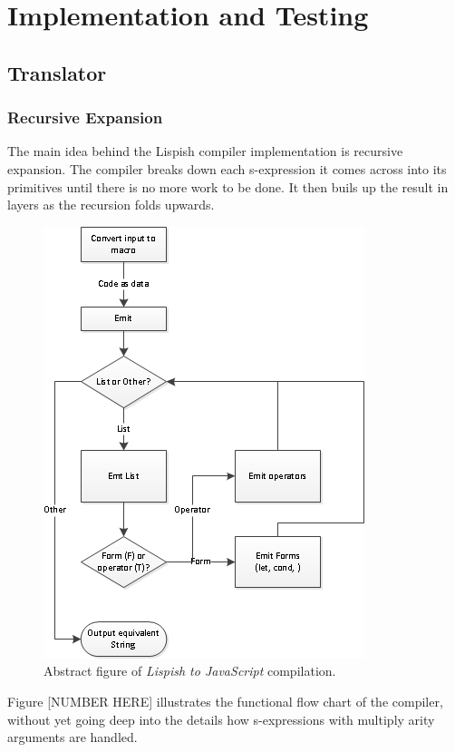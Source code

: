 \chapter{Implementation and Testing}

\section{Translator}

\subsection{Recursive Expansion}
The main idea behind the Lispish compiler implementation is recursive expansion.
The compiler breaks down each s-expression it comes across into its primitives until there is no more work to be done. It then buils up the result in layers as the recursion folds upwards. 

\begin{figure}[hb]
	\centering
	\includegraphics{Graphics/implementation_flowchart.jpg}
	\caption[Abstract \textit{Lispish to JavaScript} compilation.]
   {Abstract figure of \textit{Lispish to JavaScript} compilation.}
\end{figure}

Figure [NUMBER HERE] illustrates the functional flow chart of the compiler, without yet going deep into the details how s-expressions with multiply arity arguments are handled. 

